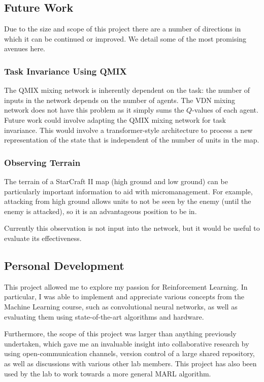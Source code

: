 \subsection{Future Work}

Due to the size and scope of this project there are a number of directions in which it can be continued or improved. We detail some of the most promising avenues here.


\subsubsection{Task Invariance Using QMIX}

The QMIX mixing network is inherently dependent on the task: the number of inputs in the network depends on the number of agents. The VDN mixing network does not have this problem as it simply sums the $Q$-values of each agent. Future work could involve adapting the QMIX mixing network for task invariance. This would involve a transformer-style architecture to process a new representation of the state that is independent of the number of units in the map.


\subsubsection{Observing Terrain}

The terrain of a StarCraft II map (high ground and low ground) can be particularly important information to aid with micromanagement. For example, attacking from high ground allows units to not be seen by the enemy (until the enemy is attacked), so it is an advantageous position to be in.

Currently this observation is not input into the network, but it would be useful to evaluate its effectiveness.


\subsection{Personal Development}
This project allowed me to explore my passion for Reinforcement Learning. In particular, I was able to implement and appreciate various concepts from the Machine Learning course, such as convolutional neural networks, as well as evaluating them using state-of-the-art algorithms and hardware.

Furthermore, the scope of this project was larger than anything previously undertaken, which gave me an invaluable insight into collaborative research by using open-communication channels, version control of a large shared repository, as well as discussions with various other lab members. This project has also been used by the lab to work towards a more general MARL algorithm.